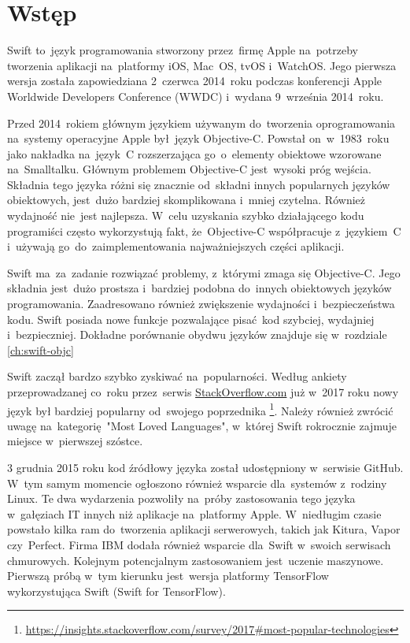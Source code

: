 \documentclass[mgr, shortabstract]{iithesis}
\author         {Maksymilian Debeściak}
\begin{document}

\chapter{Wstęp}
\label{ch:wstep}

Swift to~język programowania stworzony przez~firmę Apple na~potrzeby tworzenia aplikacji na~platformy iOS, Mac~OS, tvOS i~WatchOS. Jego pierwsza wersja została zapowiedziana 2~czerwca 2014~roku podczas konferencji Apple Worldwide Developers Conference (WWDC) i~wydana 9~września 2014~roku.

Przed 2014~rokiem głównym językiem używanym do~tworzenia oprogramowania na~systemy operacyjne Apple był~język Objective-C. Powstał on~w~1983~roku jako nakładka na~język~C rozszerzająca go~o~elementy obiektowe wzorowane na~Smalltalku. Głównym problemem Objective-C jest~wysoki próg wejścia. Składnia tego języka różni się znacznie od~składni innych popularnych języków obiektowych, jest~dużo bardziej skomplikowana i~mniej czytelna. Również wydajność nie~jest najlepsza. W~celu uzyskania szybko działającego kodu programiści często wykorzystują fakt, że~Objective-C współpracuje z~językiem~C i~używają go~do~zaimplementowania najważniejszych części aplikacji. 

Swift ma~za~zadanie rozwiązać problemy, z~którymi zmaga się Objective-C. Jego składnia jest~dużo prostsza i~bardziej podobna do~innych obiektowych języków programowania. Zaadresowano również zwiększenie wydajności i~bezpieczeństwa kodu. Swift posiada nowe funkcje pozwalające pisać kod szybciej, wydajniej i~bezpieczniej. Dokładne porównanie obydwu języków znajduje się w~rozdziale \ref{ch:swift-objc}

Swift zaczął bardzo szybko zyskiwać na~popularności. Według ankiety przeprowadzanej co~roku przez~serwis \url{StackOverflow.com} już w~2017 roku nowy język był bardziej popularny od~swojego poprzednika \footnote{\url{https://insights.stackoverflow.com/survey/2017\#most-popular-technologies}}. Należy również zwrócić uwagę na~kategorię "Most Loved Languages", w~której Swift rokrocznie zajmuje miejsce w~pierwszej szóstce.

3 grudnia 2015 roku kod źródłowy języka został udostępniony w~serwisie GitHub. W~tym samym momencie ogłoszono również wsparcie dla~systemów z~rodziny Linux. Te dwa wydarzenia pozwoliły na~próby zastosowania tego języka w~gałęziach IT innych niż aplikacje na~platformy Apple. W~niedługim czasie powstało kilka ram do~tworzenia aplikacji serwerowych, takich jak Kitura, Vapor czy~Perfect. Firma IBM dodała również wsparcie dla~Swift w~swoich serwisach chmurowych. Kolejnym potencjalnym zastosowaniem jest~uczenie maszynowe. Pierwszą próbą w~tym kierunku jest~wersja platformy TensorFlow wykorzystująca Swift (Swift for TensorFlow).
\end{document}

